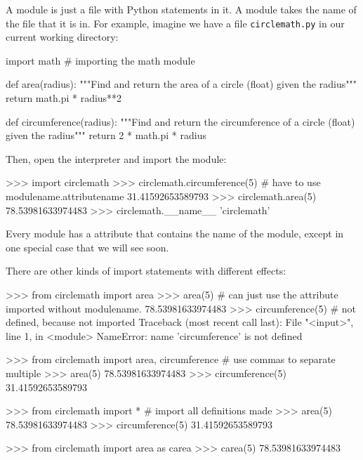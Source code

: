 \documentclass[11pt]{cselabheader}
\begin{document}
{A module is just a file with Python statements in it. A module takes the name of
the file that it is in. For example, imagine we have a file
\texttt{circlemath.py} in our current working directory:

\begin{python3code}
import math # importing the math module

def area(radius):
    """Find and return the area of a circle (float) given the radius"""
    return math.pi * radius**2

def circumference(radius):
    """Find and return the circumference of a circle (float) given the radius"""
    return 2 * math.pi * radius
\end{python3code}

Then, open the interpreter and import the module:

\begin{pyconcode}
>>> import circlemath
>>> circlemath.circumference(5) # have to use modulename.attributename
31.41592653589793
>>> circlemath.area(5)
78.53981633974483
>>> circlemath.__name__
'circlemath'
\end{pyconcode}

Every module has a  attribute that contains the name of
the module, except in one special case that we will see soon.

There are other kinds of import statements with different effects:

\begin{pyconcode}
>>> from circlemath import area
>>> area(5) # can just use the attribute imported without modulename.
78.53981633974483
>>> circumference(5) # not defined, because not imported
Traceback (most recent call last):
  File "<input>", line 1, in <module>
NameError: name 'circumference' is not defined
\end{pyconcode}

\begin{pyconcode}
>>> from circlemath import area, circumference # use commas to separate multiple
>>> area(5)
78.53981633974483
>>> circumference(5)
31.41592653589793
\end{pyconcode}

\begin{pyconcode}
>>> from circlemath import * # import all definitions made
>>> area(5)
78.53981633974483
>>> circumference(5)
31.41592653589793
\end{pyconcode}

\begin{pyconcode}
>>> from circlemath import area as carea
>>> carea(5)
78.53981633974483
\end{pyconcode}

}
\end{document}
